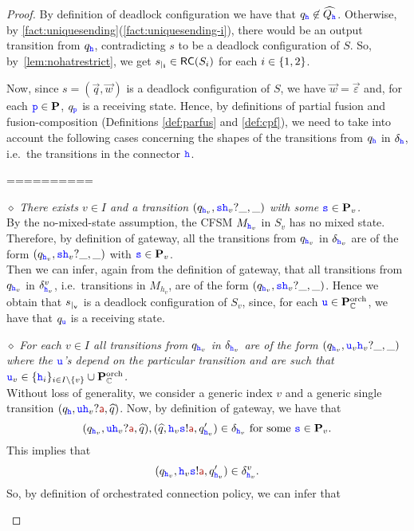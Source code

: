 \begin{proof}
By definition of deadlock configuration we have that
$q_{{\mathtt{\color{blue}{ {h}}}}}\not\in\widehat{Q_{{\mathtt{\color{blue}{ {h}}}}}}$.
Otherwise, by  \cref{fact:uniquesending}(\ref{fact:uniquesending-i}), 
there would be an output transition from $q_{{\mathtt{\color{blue}{ {h}}}}}$, contradicting $s$ to be a deadlock configuration of $S$.
So, by~\cref{lem:nohatrestrict}, we get ${s}_{\mid_{\mathbf{i}}}\in \mathsf{RC}(S_i)$ for each $i\in \{1,2\}$.

Now, since $s= (\vec{q},\vec{w})$ is a deadlock configuration of $S$, we have $\vec{w}=\vec{\varepsilon}$ and, for each ${\mathtt{\color{blue}{ {p}}}}\in\mathbf{P}$, $q_{\mathtt{\color{blue}{ {p}}}}$  is a receiving state.
Hence, by definitions of  partial fusion and fusion-composition 
(Definitions \ref{def:parfus} and \ref{def:cpf}),
we need  to 
take into account the following cases concerning the shapes of the transitions from $q_{{\mathtt{\color{blue}{ {h}}}}}$  in 
$\delta_{{\mathtt{\color{blue}{ {h}}}}}$, i.e.\ the transitions in the connector ${\mathtt{\color{blue}{ {h}}}}$. 

==========

\begin{description}  
  \item
\underline{$\diamond$} 
{\em  There exists $v\in I$ and a transition $(q_{{\mathtt{\color{blue}{ {h}}}}_v},{\mathtt{\color{blue}{ {s}}}}{{\mathtt{\color{blue}{ {h}}}}_v}?\_,\_)$ with  some ${\mathtt{\color{blue}{ {s}}}} \in \mathbf{P}_v$.}\\
 By the no-mixed-state assumption,
the CFSM $M_{{\mathtt{\color{blue}{ {h}}}}_v}$ in $S_v$ has no mixed state.
Therefore, by definition of gateway, all the transitions from $q_{{\mathtt{\color{blue}{ {h}}}}_v}$ in $\delta_{{\mathtt{\color{blue}{ {h}}}}_v}$ 
are of the form  $(q_{{\mathtt{\color{blue}{ {h}}}}_v},{\mathtt{\color{blue}{ {s}}}}{{\mathtt{\color{blue}{ {h}}}}_v}?\_,\_)$ with ${\mathtt{\color{blue}{ {s}}}} \in \mathbf{P}_v$.\\ %
Then we can infer, again from the definition of gateway, that all transitions from $q_{{\mathtt{\color{blue}{ {h}}}}_v}$
 in $\delta^v_{{\mathtt{\color{blue}{ {h}}}}_v}$, i.e.\ transitions in  $M_{h_v}$, are of the form $(q_{{\mathtt{\color{blue}{ {h}}}}_v},{\mathtt{\color{blue}{ {s}}}}{{\mathtt{\color{blue}{ {h}}}}_v}?\_,\_)$.
  Hence we obtain that ${s}_{\mid_{\mathbf{v}}}$ is a deadlock configuration of $S_v$,
 since, for each ${\mathtt{\color{blue}{ {u}}}}\in\mathbf{P}_{\mathbb{C}}^{\mathrm{orch}}$, we have that $q_{{\mathtt{\color{blue}{ {u}}}}}$ is a receiving state. 
  

\item
\underline{$\diamond$}
{\em  For each $v\in I$  all transitions from $q_{{\mathtt{\color{blue}{ {h}}}}_v}$ in $\delta_{{\mathtt{\color{blue}{ {h}}}}_v}$
are of the form  $(q_{{\mathtt{\color{blue}{ {h}}}}_v},{\mathtt{\color{blue}{ {u}}}}_v{\mathtt{\color{blue}{ {h}}}}_v?\_,\_)$
where the ${\mathtt{\color{blue}{ {u}}}}$'s depend on the particular transition and are such that
 ${\mathtt{\color{blue}{ {u}}}}_v \in \{{\mathtt{\color{blue}{ {h}}}}_i\}_{i \in I\setminus{\{v\}}}\cup\mathbf{P}_{\mathbb{C}}^{\mathrm{orch}}$.}\\
Without loss of generality, we consider a 
generic index $v$ and a generic single transition $(q_{\HH},\ttu{\HH_v}?\msg[a],\widehat{q})$.
Now, by definition of gateway, we have that
$$(q_{\HH_v},\ttu{\HH_v}?\msg[a],\widehat{q}),(\widehat{q},\HH_v{\tts}!\msg[a],q'_{\HH_v})\in \delta_{\HH_v} \text{ for some } \tts\in\roles_v.$$
This implies that
$$(q_{\HH_v},\HH_v{\tts}!\msg[a],q'_{\HH_v})\in \delta^v_{\HH_v}.$$
So, by definition of orchestrated connection policy, we can infer that 


\end{description}
\end{proof}
